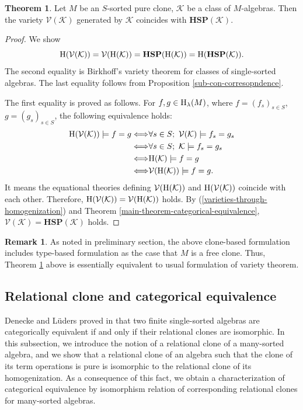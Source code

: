 \documentclass[a4paper,10pt]{article}
\theoremstyle{definition}
\newtheorem{thm}[df]{Theorem}
\newtheorem{rem}[df]{Remark}
\newcommand\V{\mathcal{V}}
\newcommand\K{\mathcal{K}}
\begin{document}
\begin{thm}\label{variety-theorem}
Let $M$ be an $S$-sorted pure clone, $\mathcal{K}$ be a class of $M$-algebras.
Then the variety $\V(\mathcal{K})$ generated by $\mathcal{K}$ coincides with
$\mathbf{HSP}(\mathcal{K})$.
\end{thm}
\begin{proof}
We show
\begin{equation}\label{varieties-through-homogenization}
{\rm H}(\V(\K))=\V({\rm H}(\K))=\mathbf{HSP}({\rm H}(\K))={\rm H}(\mathbf{HSP}(\K)).
\end{equation}
The second equality is Birkhoff's variety theorem for classes of single-sorted algebras.
The last equality follows from Proposition \ref{sub-con-corresopndence}.

The first equality is proved as follows. 
For $f,g\in {\rm H}_\lambda(M)$, where $f=(f_s)_{s\in S}$, $g=(g_s)_{s\in S}$,
the following equivalence holds:
\begin{align*}
{\rm H}(\V(\K))\models f=g
\Longleftrightarrow& \forall s\in S;\ \V(\K)\models f_s=g_s\\
\Longleftrightarrow& \forall s\in S;\ \K\models f_s=g_s\\
\Longleftrightarrow& {\rm H}(\K)\models f=g\\
\Longleftrightarrow& \V({\rm H}(\K))\models f=g.
\end{align*}
It means the equational theories defining $\V({\rm H}(\K))$ and ${\rm H}(\V(\K))$
coincide with each other.
Therefore, ${\rm H}(\V(\K))=\V({\rm H}(\K))$ holds.
By (\ref{varieties-through-homogenization}) and Theorem \ref{main-theorem-categorical-equivalence},
$\V(\K)=\mathbf{HSP}(\K)$ holds.
\end{proof}

\begin{rem}
As noted in preliminary section, the above clone-based
formulation includes type-based formulation
as the case that $M$ is a free clone.
Thus, Theorem \ref{variety-theorem} above is essentially equivalent
to usual formulation of variety theorem.
\end{rem}


\subsection{Relational clone and categorical equivalence}
\label{s-relational-clone-and-categorical-equivalence}

Denecke and L\"{u}ders proved in \cite{DL} that two finite single-sorted algebras are
categorically equivalent if and only if their relational clones are isomorphic.
In this subsection, we introduce the notion of a relational clone of a many-sorted algebra, and we show that a relational clone of an algebra
such that the clone of its term operations is pure is isomorphic to the relational
clone of its homogenization.
As a consequence of this fact, we obtain a characterization of categorical equivalence
by isomorphism relation of corresponding relational clones for many-sorted algebras.
\end{document}
